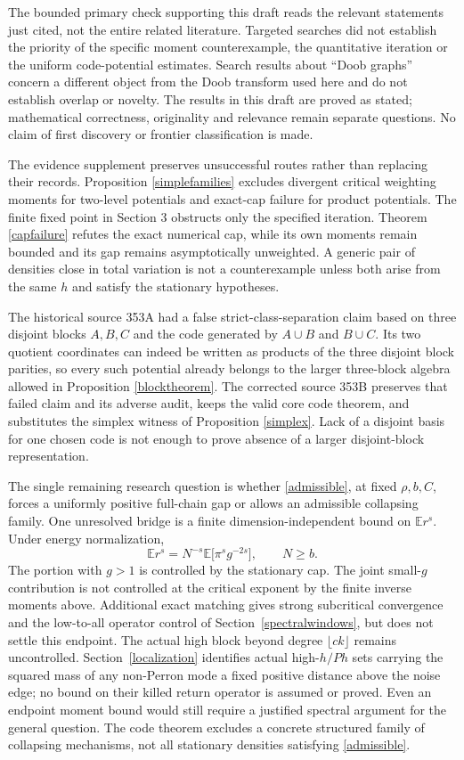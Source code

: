 \documentclass[11pt]{article}
\newcommand{\E}{\mathbb E}
\begin{document}
The bounded primary check supporting this draft reads the relevant statements just cited, not the entire related literature. Targeted searches did not establish the priority of the specific moment counterexample, the quantitative iteration or the uniform code-potential estimates. Search results about ``Doob graphs'' concern a different object from the Doob transform used here and do not establish overlap or novelty. The results in this draft are proved as stated; mathematical correctness, originality and relevance remain separate questions. No claim of first discovery or frontier classification is made.

The evidence supplement preserves unsuccessful routes rather than replacing their records. Proposition \ref{simplefamilies} excludes divergent critical weighting moments for two-level potentials and exact-cap failure for product potentials. The finite fixed point in Section 3 obstructs only the specified iteration. Theorem \ref{capfailure} refutes the exact numerical cap, while its own moments remain bounded and its gap remains asymptotically unweighted. A generic pair of densities close in total variation is not a counterexample unless both arise from the same $h$ and satisfy the stationary hypotheses.

The historical source 353A had a false strict-class-separation claim based on three disjoint blocks $A,B,C$ and the code generated by $A\cup B$ and $B\cup C$. Its two quotient coordinates can indeed be written as products of the three disjoint block parities, so every such potential already belongs to the larger three-block algebra allowed in Proposition \ref{blocktheorem}. The corrected source 353B preserves that failed claim and its adverse audit, keeps the valid core code theorem, and substitutes the simplex witness of Proposition \ref{simplex}. Lack of a disjoint basis for one chosen code is not enough to prove absence of a larger disjoint-block representation.

The single remaining research question is whether \eqref{admissible}, at fixed $\rho,b,C$, forces a uniformly positive full-chain gap or allows an admissible collapsing family. One unresolved bridge is a finite dimension-independent bound on $\E r^s$. Under energy normalization,
\[
 \E r^s=N^{-s}\E\bigl[\pi^s g^{-2s}\bigr],\qquad N\geq b.
\]
The portion with $g>1$ is controlled by the stationary cap. The joint small-$g$ contribution is not controlled at the critical exponent by the finite inverse moments above. Additional exact matching gives strong subcritical convergence and the low-to-all operator control of Section~\ref{spectralwindows}, but does not settle this endpoint. The actual high block beyond degree $\lfloor ck\rfloor$ remains uncontrolled. Section~\ref{localization} identifies actual high-$h/Ph$ sets carrying the squared mass of any non-Perron mode a fixed positive distance above the noise edge; no bound on their killed return operator is assumed or proved. Even an endpoint moment bound would still require a justified spectral argument for the general question. The code theorem excludes a concrete structured family of collapsing mechanisms, not all stationary densities satisfying \eqref{admissible}.
\end{document}
